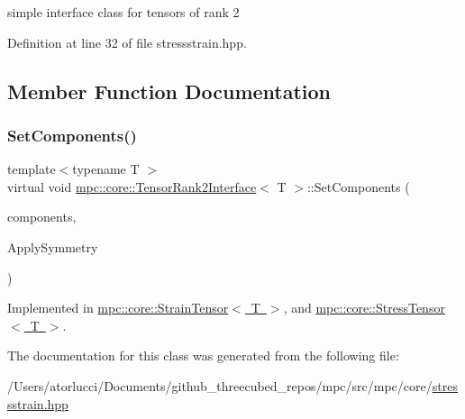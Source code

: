 simple interface class for tensors of rank 2 

Definition at line 32 of file stressstrain.\+hpp.



\subsection{Member Function Documentation}
\mbox{\label{structmpc_1_1core_1_1_tensor_rank2_interface_a7d220631fe32f06ec52e5724873a00d9}} 
\subsubsection{\texorpdfstring{Set\+Components()}{SetComponents()}}
{\footnotesize\ttfamily template$<$typename T $>$ \\
virtual void \mbox{\hyperlink{structmpc_1_1core_1_1_tensor_rank2_interface}{mpc\+::core\+::\+Tensor\+Rank2\+Interface}}$<$ T $>$\+::Set\+Components (\begin{DoxyParamCaption}\item[{std\+::set$<$ \mbox{\hyperlink{namespacempc_1_1core_a467e1fa517a8c269b033fef3aa281360}{mpc\+::core\+::\+Tensor\+Rank2\+Component}}$<$ T $>$ $>$ \&}]{components,  }\item[{bool}]{Apply\+Symmetry }\end{DoxyParamCaption})\hspace{0.3cm}{\ttfamily [pure virtual]}}



Implemented in \mbox{\hyperlink{structmpc_1_1core_1_1_strain_tensor_a9e208aa77d77296f5fc6fdadd76b018f}{mpc\+::core\+::\+Strain\+Tensor$<$ T $>$}}, and \mbox{\hyperlink{structmpc_1_1core_1_1_stress_tensor_afbac9aaa45907cdbed3ed779b0551bad}{mpc\+::core\+::\+Stress\+Tensor$<$ T $>$}}.



The documentation for this class was generated from the following file\+:\begin{DoxyCompactItemize}
\item 
/\+Users/atorlucci/\+Documents/github\+\_\+threecubed\+\_\+repos/mpc/src/mpc/core/\mbox{\hyperlink{stressstrain_8hpp}{stressstrain.\+hpp}}\end{DoxyCompactItemize}
